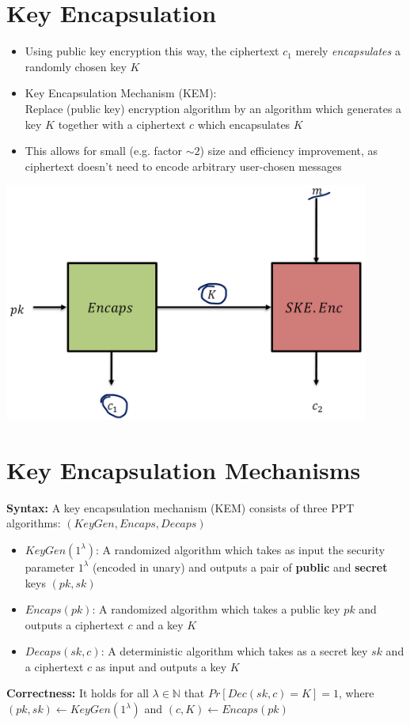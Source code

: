 \section{Key Encapsulation}
	\begin{itemize}
		\item Using public key encryption this way, the ciphertext $c_1$ merely \textit{encapsulates} a randomly chosen key $K$
		\item Key Encapsulation Mechanism (KEM):\\
		Replace (public key) encryption algorithm by an algorithm which generates a key $K$ together with a ciphertext $c$ which encapsulates $K$
		\item This allows for small (e.g. factor $\sim 2$) size and efficiency improvement, as ciphertext doesn’t need to encode arbitrary user-chosen messages
	\end{itemize}
	\begin{center}
		\includegraphics[width=120mm]{Graphics/Hybrid Encryption/he3.png}
	\end{center}

\section{Key Encapsulation Mechanisms}
	\textbf{Syntax:} A key encapsulation mechanism (KEM) consists of three PPT algorithms: $(KeyGen,Encaps,Decaps)$
	\begin{itemize}
		\item $KeyGen(1^{\lambda})$: A randomized algorithm which takes as input the security parameter $1^{\lambda}$ (encoded in unary) 
		and outputs a pair of \textbf{public} and \textbf{secret} keys $(pk,sk)$
		\item $Encaps(pk)$: A randomized algorithm which takes a public key $pk$ and outputs a ciphertext $c$ and a key $K$
		\item $Decaps(sk,c)$: A deterministic algorithm which takes as a secret key $sk$ and a ciphertext $c$ as input and outputs a key $K$
	\end{itemize}
	\textbf{Correctness:} It holds for all $\lambda \in \mathbb{N}$ that $Pr[Dec(sk,c)=K]=1$, where $(pk,sk) \leftarrow KeyGen(1^{\lambda})$ and $(c,K) \leftarrow Encaps(pk)$

